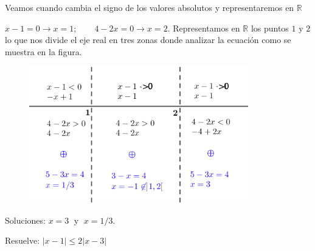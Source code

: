 		\begin{proofw}\renewcommand{\qedsymbol}{$\diamond$}
		
			Veamos cuando cambia el signo de los valores absolutos y representaremos en $\mathbb R$
			
			$x-1=0 \to  x=1; \qquad 4-2x=0 \to x=2$. Representamos en $\mathbb R$ los puntos $1$ y $2$ lo que nos divide el eje real en tres zonas donde analizar la ecuación como se muestra en la figura.
			
			\begin{figure}[H]
			\centering
				\includegraphics[width=0.85\textwidth]{imagenes/imagenes01/T01IM05.png}
			\end{figure}
			
			Soluciones:  $x=3\; $ y $\; x=1/3$.
		\end{proofw}
		
		\begin{ejre}
			Resuelve: $|x-1|\le2|x-3|$
		\end{ejre}
		

